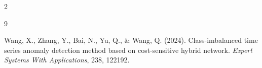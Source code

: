 \documentclass[11pt]{article}
\begin{document}
\begin{multicols}{2}
        \begin{thebibliography}{9}
        
    Wang, X., Zhang, Y., Bai, N., Yu, Q., \& Wang, Q. (2024). Class-imbalanced time series anomaly detection method based on cost-sensitive hybrid network. \textit{Expert Systems With Applications}, 238, 122192.

\end{thebibliography}

    \end{multicols}
\end{document}
